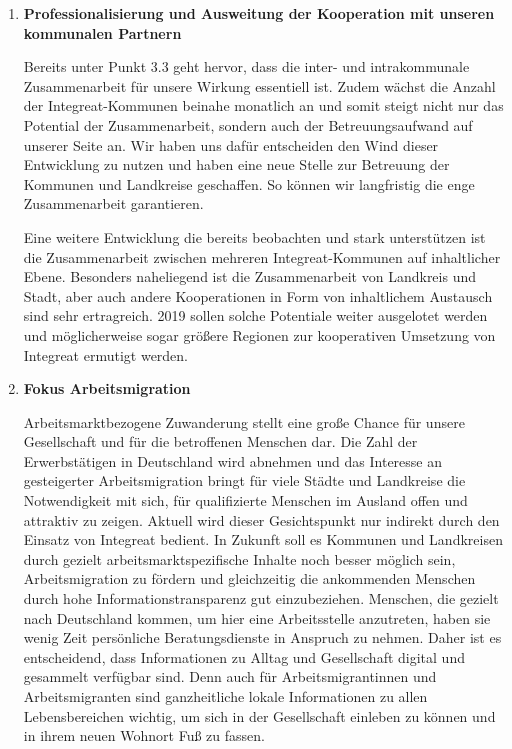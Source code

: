 \documentclass[12pt, a4paper]{article} %
\begin{document}
\begin{enumerate}
\def\labelenumi{\arabic{enumi}.}
\item
\textbf{Professionalisierung und Ausweitung der Kooperation mit
unseren kommunalen Partnern}

Bereits unter Punkt 3.3 geht hervor, dass die inter- und intrakommunale
Zusammenarbeit für unsere Wirkung essentiell ist. Zudem wächst die
Anzahl der Integreat-Kommunen beinahe monatlich an und somit steigt
nicht nur das Potential der Zusammenarbeit, sondern auch der
Betreuungsaufwand auf unserer Seite an. Wir haben uns dafür entscheiden
den Wind dieser Entwicklung zu nutzen und haben eine neue Stelle zur
Betreuung der Kommunen und Landkreise geschaffen. So können wir
langfristig die enge Zusammenarbeit garantieren.

Eine weitere Entwicklung die bereits beobachten und stark unterstützen
ist die Zusammenarbeit zwischen mehreren Integreat-Kommunen auf
inhaltlicher Ebene. Besonders naheliegend ist die Zusammenarbeit von
Landkreis und Stadt, aber auch andere Kooperationen in Form von
inhaltlichem Austausch sind sehr ertragreich. 2019 sollen solche
Potentiale weiter ausgelotet werden und möglicherweise sogar größere
Regionen zur kooperativen Umsetzung von Integreat ermutigt werden.

\item
\textbf{Fokus Arbeitsmigration}

Arbeitsmarktbezogene Zuwanderung stellt eine große Chance für unsere
Gesellschaft und für die betroffenen Menschen dar. Die Zahl der
Erwerbstätigen in Deutschland wird abnehmen und das Interesse an
gesteigerter Arbeitsmigration bringt für viele Städte und Landkreise die
Notwendigkeit mit sich, für qualifizierte Menschen im Ausland offen und
attraktiv zu zeigen. Aktuell wird dieser Gesichtspunkt nur indirekt
durch den Einsatz von Integreat bedient. In Zukunft soll es Kommunen und
Landkreisen durch gezielt arbeitsmarktspezifische Inhalte noch besser
möglich sein, Arbeitsmigration zu fördern und gleichzeitig die
ankommenden Menschen durch hohe Informationstransparenz gut
einzubeziehen. Menschen, die gezielt nach Deutschland kommen, um hier
eine Arbeitsstelle anzutreten, haben sie wenig Zeit persönliche
Beratungsdienste in Anspruch zu nehmen. Daher ist es entscheidend, dass
Informationen zu Alltag und Gesellschaft digital und gesammelt verfügbar
sind. Denn auch für Arbeitsmigrantinnen und Arbeitsmigranten sind
ganzheitliche lokale Informationen zu allen Lebensbereichen wichtig, um
sich in der Gesellschaft einleben zu können und in ihrem neuen Wohnort
Fuß zu fassen.


\end{enumerate}
\end{document}
